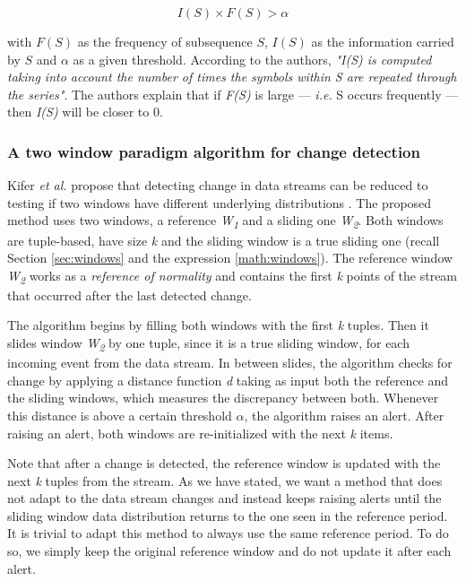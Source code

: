 \begin{equation*}
    I(S) \times F(S) > \alpha
\end{equation*}

with $F(S)$ as the frequency of subsequence $S$, $I(S)$ as the information carried by $S$ and $\alpha$ as a given threshold. According to the authors, \textit{"I(S) is computed taking into account the number of times the symbols within S are repeated through the series"}. The authors explain that if \textit{F(S)} is large --- \textit{i.e.} S occurs frequently --- then \textit{I(S)} will be closer to 0.

\subsubsection{A two window paradigm algorithm for change detection} \label{kifer}
Kifer \emph{et al.} propose that detecting change in data streams can be reduced to testing if two windows have different underlying distributions \cite{Kifer-Detecting-Change}. The proposed method uses two windows, a reference \textit{W\textsubscript{1}} and a sliding one \textit{W\textsubscript{2}}. Both windows are tuple-based, have size \textit{k} and the sliding window is a true sliding one (recall Section \ref{sec:windows} and the expression \ref{math:windows}). The reference window \textit{W\textsubscript{2}} works as a \textit{reference of normality} and contains the first \textit{k} points of the stream that occurred after the last detected change.

The algorithm begins by filling both windows with the first \textit{k} tuples. Then it slides window \textit{W\textsubscript{2}} by one tuple, since it is a true sliding window, for each incoming event from the data stream. In between slides, the algorithm checks for change by applying a distance function \textit{d} taking as input both the reference and the sliding windows, which measures the discrepancy between both. Whenever this distance is above a certain threshold $\alpha$, the algorithm raises an alert. After raising an alert, both windows are re-initialized with the next \textit{k} items.

Note that after a change is detected, the reference window is updated with the next \textit{k} tuples from the stream. As we have stated, we want a method that does not adapt to the data stream changes and instead keeps raising alerts until the sliding window data distribution returns to the one seen in the reference period. It is trivial to adapt this method to always use the same reference period. To do so, we simply keep the original reference window and do not update it after each alert.

